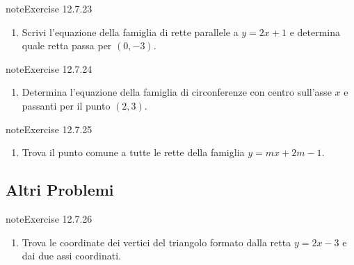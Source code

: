 \documentclass[letterpaper,10pt,italian]{jupyterBook}
\begin{document}
\begin{sphinxadmonition}{note}{Exercise 12.7.23}


\begin{enumerate}
%
\setcounter{enumi}{22}
\item {} 
\sphinxAtStartPar
Scrivi l’equazione della famiglia di rette parallele a \( y = 2x + 1 \) e determina quale retta passa per \( (0, -3) \).

\end{enumerate}
\end{sphinxadmonition}
 \label{exercise:ch/analytic_geometry/analytic_geometry_2d/sol-exercise-23}

\begin{sphinxadmonition}{note}{Exercise 12.7.24}


\begin{enumerate}
%
\setcounter{enumi}{23}
\item {} 
\sphinxAtStartPar
Determina l’equazione della famiglia di circonferenze con centro sull’asse \( x \) e passanti per il punto \( (2, 3) \).

\end{enumerate}
\end{sphinxadmonition}
 \label{exercise:ch/analytic_geometry/analytic_geometry_2d/sol-exercise-24}

\begin{sphinxadmonition}{note}{Exercise 12.7.25}


\begin{enumerate}
%
\setcounter{enumi}{24}
\item {} 
\sphinxAtStartPar
Trova il punto comune a tutte le rette della famiglia \( y = mx + 2m - 1 \).

\end{enumerate}
\end{sphinxadmonition}


\subsection{Altri Problemi}
\label{\detokenize{ch/analytic_geometry/analytic_geometry_2d/sol:altri-problemi}} \label{exercise:ch/analytic_geometry/analytic_geometry_2d/sol-exercise-25}

\begin{sphinxadmonition}{note}{Exercise 12.7.26}


\begin{enumerate}
%
\setcounter{enumi}{25}
\item {} 
\sphinxAtStartPar
Trova le coordinate dei vertici del triangolo formato dalla retta \( y = 2x - 3 \) e dai due assi coordinati.

\end{enumerate}
\end{sphinxadmonition}
 \label{exercise:ch/analytic_geometry/analytic_geometry_2d/sol-exercise-26}
\end{document}
